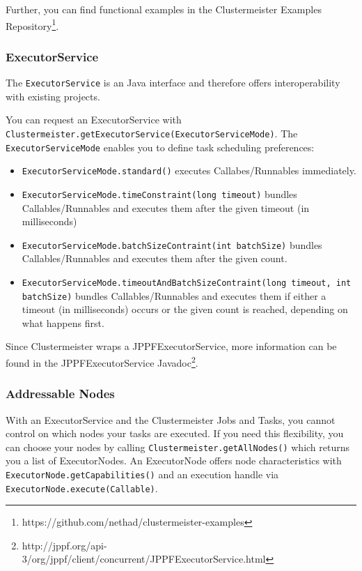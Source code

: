 Further, you can find functional examples in the Clustermeister Examples Repository\footnote{https://github.com/nethad/clustermeister-examples}.

\subsubsection{ExecutorService}

The \texttt{ExecutorService} is an Java interface and therefore offers interoperability with existing projects.

You can request an ExecutorService with \texttt{Clustermeister.getExecutorService(ExecutorServiceMode)}. The \texttt{ExecutorServiceMode} enables you to define task scheduling preferences:

\begin{itemize}
 \item \texttt{ExecutorServiceMode.standard()} executes Callabes/Runnables immediately.
 \item \texttt{ExecutorServiceMode.timeConstraint(long timeout)} bundles Callables/Runnables and executes them after the given timeout (in milliseconds)
 \item \texttt{ExecutorServiceMode.batchSizeContraint(int batchSize)} bundles Callables/Runnables and executes them after the given count.
 \item \texttt{ExecutorServiceMode.timeoutAndBatchSizeContraint(long timeout, int batchSize)} bundles Callables/Runnables and executes them if either a timeout (in milliseconds) occurs or the given count is reached, depending on what happens first.
\end{itemize}

Since Clustermeister wraps a JPPFExecutorService, more information can be found in the JPPFExecutorService Javadoc\footnote{http://jppf.org/api-3/org/jppf/client/concurrent/JPPFExecutorService.html}.

\subsubsection{Addressable Nodes}

With an ExecutorService and the Clustermeister Jobs and Tasks, you cannot control on which nodes your tasks are executed. If you need this flexibility, you can choose your nodes by calling \texttt{Clustermeister.getAllNodes()} which returns you a list of ExecutorNodes. An ExecutorNode offers node characteristics with \texttt{ExecutorNode.getCapabilities()} and an execution handle via \texttt{ExecutorNode.execute(Callable)}.

